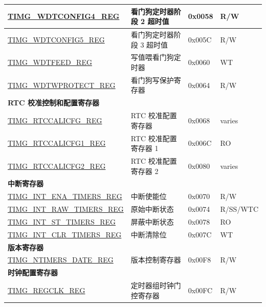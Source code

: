 \begin{longtable}{ | p{6cm} | p{7.2cm} | p{1.3cm} | p{1cm} | }
    \hyperref[regdesc:TIMGWDTCONFIG4REG]{TIMG\_WDTCONFIG4\_REG} & 看门狗定时器阶段 2 超时值 & 0x0058 & R/W \\ \hline
    \hyperref[regdesc:TIMGWDTCONFIG5REG]{TIMG\_WDTCONFIG5\_REG} & 看门狗定时器阶段 3 超时值 & 0x005C & R/W \\ \hline
    \hyperref[regdesc:TIMGWDTFEEDREG]{TIMG\_WDTFEED\_REG} & 写值喂看门狗定时器 & 0x0060 & WT \\ \hline
    \hyperref[regdesc:TIMGWDTWPROTECTREG]{TIMG\_WDTWPROTECT\_REG} & 看门狗写保护寄存器 & 0x0064 & R/W \\ \hline
    \multicolumn{4}{|l|}{\textbf{RTC 校准控制和配置寄存器}} \\ \hline
    \hyperref[regdesc:TIMGRTCCALICFGREG]{TIMG\_RTCCALICFG\_REG} & RTC 校准配置寄存器 & 0x0068 & varies \\ \hline
    \hyperref[regdesc:TIMGRTCCALICFG1REG]{TIMG\_RTCCALICFG1\_REG} & RTC 校准配置寄存器 1 & 0x006C & RO \\ \hline
    \hyperref[regdesc:TIMGRTCCALICFG2REG]{TIMG\_RTCCALICFG2\_REG} & RTC 校准配置寄存器 2 & 0x0080 & varies \\ \hline
    \multicolumn{4}{|l|}{\textbf{中断寄存器}} \\ \hline
    \hyperref[regdesc:TIMGINTENATIMERSREG]{TIMG\_INT\_ENA\_TIMERS\_REG} & 中断使能位 & 0x0070 & R/W \\ \hline
    \hyperref[regdesc:TIMGINTRAWTIMERSREG]{TIMG\_INT\_RAW\_TIMERS\_REG} & 原始中断状态 & 0x0074 & R/SS/WTC \\ \hline
    \hyperref[regdesc:TIMGINTSTTIMERSREG]{TIMG\_INT\_ST\_TIMERS\_REG} & 屏蔽中断状态 & 0x0078 & RO \\ \hline
    \hyperref[regdesc:TIMGINTCLRTIMERSREG]{TIMG\_INT\_CLR\_TIMERS\_REG} & 中断清除位 & 0x007C & WT \\ \hline
    \multicolumn{4}{|l|}{\textbf{版本寄存器}} \\ \hline
    \hyperref[regdesc:TIMGNTIMERSDATEREG]{TIMG\_NTIMERS\_DATE\_REG} & 版本控制寄存器 & 0x00F8 & R/W \\ \hline
    \multicolumn{4}{|l|}{\textbf{时钟配置寄存器}} \\ \hline
    \hyperref[regdesc:TIMGREGCLKREG]{TIMG\_REGCLK\_REG} & 定时器组时钟门控寄存器 & 0x00FC & R/W \\ \hline
    \end{longtable}
